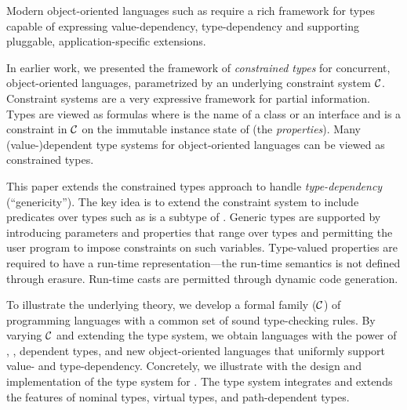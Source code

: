 Modern object-oriented languages such as \Xten{} require a rich
framework for types capable of expressing value-dependency,
type-dependency and supporting pluggable, application-specific
extensions.

In earlier work, we presented the framework of \emph{constrained types}
for concurrent, object-oriented languages, parametrized by an
underlying constraint system $\cal C$. Constraint systems are a very
expressive framework for partial information. Types are viewed as
formulas  where  is the name of a class or an interface
and
 is a constraint in $\cal C$ on the immutable instance state of
 (the \emph{properties}). Many (value-)dependent type systems
for object-oriented languages can be viewed as constrained types.

This paper extends the constrained types approach to handle
\emph{type-dependency} (``genericity''). The key idea is to extend
the constraint system to include predicates over types
such as  is a subtype of .  Generic types are supported
by introducing parameters and properties that range over types and
permitting the user program to impose constraints on such
variables. Type-valued properties are required to have a run-time
representation---the run-time semantics is not defined through
erasure. Run-time casts are permitted through dynamic code generation.

To illustrate the underlying theory, we develop a formal family
\FX{}(${\cal C}$) of programming languages with a common set of sound
type-checking rules.  By varying $\cal C$ and extending the type system,
we obtain languages with
the power of \FJ, \FGJ, dependent types,
and new object-oriented languages that
uniformly support value- and type-dependency.  Concretely, we
illustrate with the design and implementation of the type system for
\Xten{}.  The type system integrates and extends the features of
nominal types, virtual types, and path-dependent
types.
